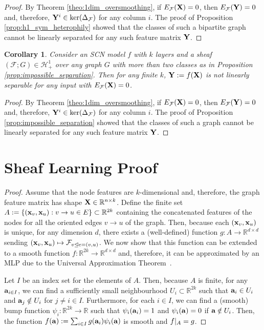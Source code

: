 \documentclass{article}
\newtheorem{corollary}[theorem]{Corollary}
\def\va{{\bf{a}}}
\def\vx{{\bf{x}}}
\def\mX{{\bf{X}}}
\def\mY{{\bf{Y}}}
\def\gF{{\mathcal{F}}}
\def\gH{{\mathcal{H}}}
\def\sR{{\mathbb{R}}}
\newcommand{\tleq}{\trianglelefteq}
\begin{document}
\begin{proof}
By Theorem \ref{theo:1dim_oversmoothing}, if $E_\gF(\mX) = 0$, then $E_\gF(\mY) = 0$ and, therefore, $\mY^i \in \ker(\Delta_\gF)$ for any column $i$. The proof of Proposition \ref{prop:h1_sym_heterophily} showed that the classes of such a bipartite graph cannot be linearly separated for any such feature matrix $\mY$. 
\end{proof}

\begin{corollary}\label{cor:gcn_two}
Consider an SCN model $f$ with $k$ layers and a sheaf $(\gF; G) \in \gH^1_{+}$ over any graph $G$ with more than two classes as in Proposition \ref{prop:impossible_separation}. Then for any finite $k$, $\mY := f(\mX)$ is not linearly separable for any input with $E_\gF(\mX) = 0$.  
\end{corollary}

\begin{proof}
By Theorem \ref{theo:1dim_oversmoothing}, if $E_\gF(\mX) = 0$, then $E_\gF(\mY) = 0$ and, therefore, $\mY^i \in \ker(\Delta_\gF)$ for any column $i$. The proof of Proposition \ref{prop:impossible_separation} showed that the classes of such a graph cannot be linearly separated for any such feature matrix $\mY$. \end{proof}

\section{Sheaf Learning Proof}

\SheafLearning*
\begin{proof}
Assume that the node features are $k$-dimensional and, therefore, the graph feature matrix has shape $\mX \in \sR^{n \times k}$. Define the finite set $A := \{ (\vx_v, \vx_u) : v \rightarrow u \in E\} \subset \sR^{2k}$ containing the concatenated features of the nodes for all the oriented edges $v \rightarrow u$ of the graph. Then, because each $(\vx_v, \vx_u)$ is unique, for any dimension $d$, there exists a (well-defined) function $g: A \to \sR^{d \times d}$ sending $(\vx_v, \vx_u) \mapsto \gF_{v \tleq e = (v, u)}$. We now show that this function can be extended to a smooth function $f: \sR^{2k} \to \sR^{d \times d}$ and, therefore, it can be approximated by an MLP due to the Universal Approximation Theorem~\citep{hornik1989multilayer, hornik1991approximation}.

Let $I$ be an index set for the elements of $A$. Then, because $A$ is finite, for any $\va_{i \in I}$, we can find a sufficiently small neighbourhood $U_i \subset \sR^{2k}$ such that $\va_i \in U_i$ and $\va_j \notin U_i$ for $j \neq i \in I$. Furthermore, for each $i \in I$, we can find a (smooth) bump function $\psi_i: \sR^{2k} \to \sR$ such that $\psi_i(\va_i) = 1$ and $\psi_i(\va) = 0$ if $\va \notin U_i$. Then, the function $f(\va) := \sum_{i \in I} g(\va_i)\psi_i(\va)$ is smooth and $f\arrowvert_A = g$.
\end{proof}
\end{document}
